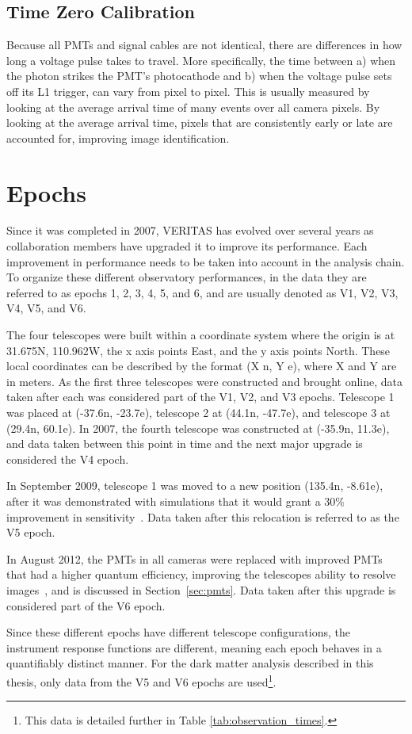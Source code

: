 \subsection{Time Zero Calibration}
Because all PMTs and signal cables are not identical, there are differences in how long a voltage pulse takes to travel.
More specifically, the time between a) when the photon strikes the PMT's photocathode and b) when the voltage pulse sets off its L1 trigger, can vary from pixel to pixel.
This is usually measured by looking at the average arrival time of many events over all camera pixels.
By looking at the average arrival time, pixels that are consistently early or late are accounted for, improving image identification.

\section{Epochs}\label{sec:epochs}
Since it was completed in 2007, VERITAS has evolved over several years as collaboration members have upgraded it to improve its performance.
Each improvement in performance needs to be taken into account in the analysis chain.
To organize these different observatory performances, in the data they are referred to as epochs 1, 2, 3, 4, 5, and 6, and are usually denoted as V1, V2, V3, V4, V5, and V6.

The four telescopes were built within a coordinate system where the origin is at 31.675N, 110.962W, the x axis points East, and the y axis points North.
These local coordinates can be described by the format (X n, Y e), where X and Y are in meters.
As the first three telescopes were constructed and brought online, data taken after each was considered part of the V1, V2, and V3 epochs.
Telescope 1 was placed at (-37.6n, -23.7e), telescope 2 at (44.1n, -47.7e), and telescope 3 at (29.4n, 60.1e).
In 2007, the fourth telescope was constructed at (-35.9n, 11.3e), and data taken between this point in time and the next major upgrade is considered the V4 epoch.

In September 2009, telescope 1 was moved to a new position (135.4n, -8.61e), after it was demonstrated with simulations that it would grant a \nicetilde{}30\% improvement in sensitivity~\cite{veritas_t1_move}.
Data taken after this relocation is referred to as the V5 epoch.

In August 2012, the PMTs in all cameras were replaced with improved PMTs that had a higher quantum efficiency, improving the telescopes ability to resolve images~\cite{pmtmodels}, and is discussed in Section~\ref{sec:pmts}.
Data taken after this upgrade is considered part of the V6 epoch.

Since these different epochs have different telescope configurations, the instrument response functions are different, meaning each epoch behaves in a quantifiably distinct manner.
For the dark matter analysis described in this thesis, only data from the V5 and V6 epochs are used\footnote{This data is detailed further in Table \ref{tab:observation_times}.}.


